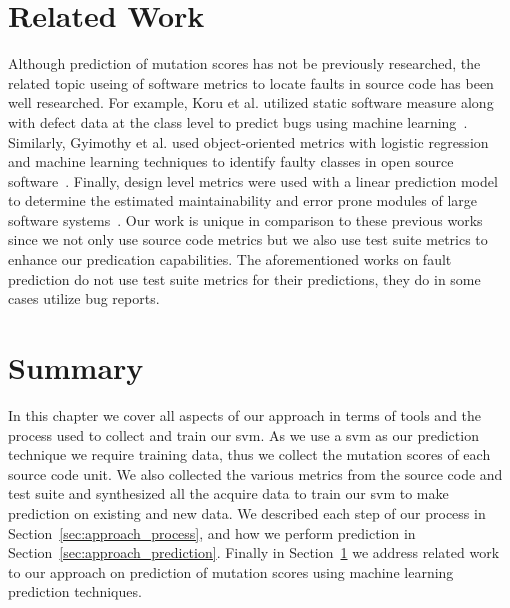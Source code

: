 \section{Related Work}
\label{sec:approach_related_work}
Although prediction of mutation scores has not be previously researched, the related topic useing of software metrics to locate faults in source code has been well researched. For example, Koru et al. utilized static software measure along with defect data at the class level to predict bugs using machine learning~\cite{KL05}. Similarly, Gyimothy et al. used object-oriented metrics with logistic regression and machine learning techniques to identify faulty classes in open source software~\cite{GFS05}. Finally, design level metrics were used with a linear prediction model to determine the estimated maintainability and error prone modules of large software systems~\cite{MKPS00}. Our work is unique in comparison to these previous works since we not only use source code metrics but we also use test suite metrics to enhance our predication capabilities. The aforementioned works on fault prediction do not use test suite metrics for their predictions, they do in some cases utilize bug reports.


\section{Summary}
\label{sec:approach_summary}
In this chapter we cover all aspects of our approach in terms of tools and the process used to collect and train our \gls{svm}. As we use a \gls{svm} as our prediction technique we require training data, thus we collect the mutation scores of each source code unit. We also collected the various metrics from the source code and test suite and synthesized all the acquire data to train our \gls{svm} to make prediction on existing and new data. We described each step of our process in Section~\ref{sec:approach_process}, and how we perform prediction in Section~\ref{sec:approach_prediction}. Finally in Section~\ref{sec:approach_related_work} we address related work to our approach on prediction of mutation scores using machine learning prediction techniques.
